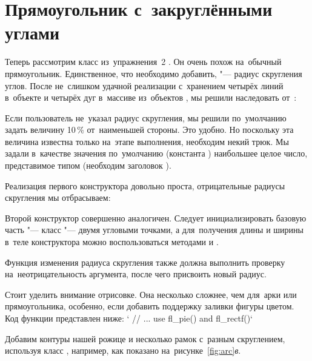\section{Прямоугольник с~закруглёнными углами}
Теперь рассмотрим класс  из~упражнения~2 . Он очень похож на~обычный прямоугольник. Единственное, что необходимо добавить, "--- радиус скругления углов. После не~слишком удачной реализации с~хранением четырёх линий в~объекте  и четырёх дуг в~массиве из~объектов , мы решили наследовать от~:

Если пользователь не~указал радиус скругления, мы решили по~умолчанию задать величину 10\,\% от~наименьшей стороны. Это удобно. Но поскольку эта величина известна только на~этапе выполнения, необходим некий трюк. Мы задали в~качестве значения по~умолчанию (константа ) наибольшее целое число, представимое типом  (необходим заголовок ).

Реализация первого конструктора довольно проста, отрицательные радиусы скругления мы отбрасываем:

Второй конструктор совершенно аналогичен. Следует инициализировать базовую часть "--- класс  "--- двумя угловыми точками, а для~получения длины и ширины в~теле конструктора можно воспользоваться методами  и .

Функция изменения радиуса скругления  также должна выполнить проверку на~неотрицательность аргумента, после чего присвоить новый радиус.

Стоит уделить внимание отрисовке. Она несколько сложнее, чем для~арки или прямоугольника, особенно, если добавить поддержку заливки фигуры цветом. Код функции представлен ниже:
\cpp`    // ... use fl_pie() and fl_rectf()`

Добавим контуры нашей рожице и несколько рамок с~разным скруглением, используя класс , например, как показано на~рисунке~\ref{fig:arc}\textit{в}.







